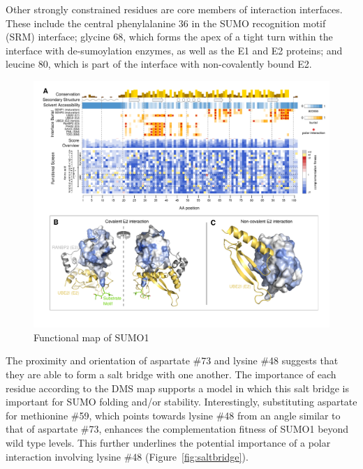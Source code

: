 Other strongly constrained residues are core members of interaction interfaces. These include the central phenylalanine 36 in the SUMO recognition motif (SRM) interface; glycine 68, which forms the apex of a tight turn within the interface with de-sumoylation enzymes, as well as the E1 and E2 proteins; and leucine 80, which is part of the interface with non-covalently bound E2. 

\begin{figure}[h!]
	\centering
	\includegraphics[width=\textwidth]{img/sumo-map.pdf}
	\caption{Functional map of SUMO1}
	\label{fig:sumo-map}
\end{figure}

The proximity and orientation of aspartate \#73 and lysine \#48 suggests that they are able to form a salt bridge with one another.  The importance of each residue according to the DMS map supports a model in which this salt bridge is important for SUMO folding and/or stability. Interestingly, substituting aspartate for methionine \#59, which points towards lysine \#48 from an angle similar to that of aspartate \#73, enhances the complementation fitness of SUMO1 beyond wild type levels.  This further underlines the potential importance of a polar interaction involving lysine \#48 (Figure~\ref{fig:saltbridge}).

